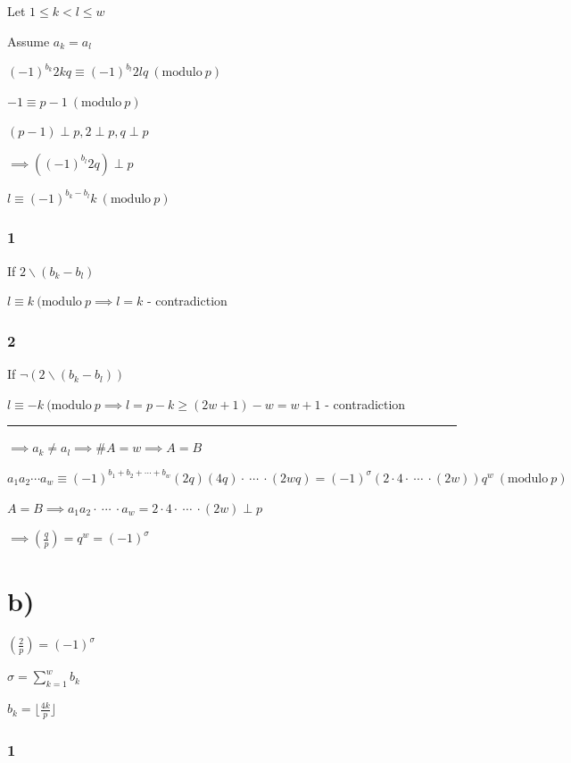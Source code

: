 \documentclass{article}
\begin{document}
Let \( 1 \leq k < l \leq w \)

Assume \( a_k = a_l \)

\( (-1)^{b_k} 2kq \equiv (-1)^{b_l} 2lq \ (\mathrm{modulo}\ p) \)

\( -1 \equiv p - 1  \ (\mathrm{modulo}\ p) \)

\( (p - 1) \perp p, 2 \perp p, q \perp p \)

\( \implies ((-1)^{b_l} 2q) \perp p \)

\( l \equiv (-1)^{b_k-b_l}k \ (\mathrm{modulo}\ p) \)

\subsubsection*{1}

If \( 2 \backslash (b_k - b_l) \)

\( l \equiv k \ (\mathrm{modulo}\ p \implies l = k \) - contradiction

\subsubsection*{2}

If \( \lnot(2 \backslash (b_k - b_l)) \)

\( l \equiv -k \ (\mathrm{modulo}\ p \implies l = p - k \geq (2w+1)-w = w + 1 \) - contradiction

\bigskip\hrule\bigskip

\( \implies a_k \neq a_l \implies \#A = w \implies A = B \)

\( a_1a_2\cdots a_w \equiv (-1)^{b_1+b_2+\cdots + b_w} (2q)(4q) \cdot\ \cdots\ \cdot (2wq) = (-1)^{\sigma} (2 \cdot 4 \cdot\ \cdots\ \cdot (2w))q^w \ (\mathrm{modulo}\ p) \)

\( A = B \implies a_1a_2 \cdot\ \cdots\ \cdot a_w = 2 \cdot 4 \cdot\ \cdots\ \cdot (2w) \perp p \)

\( \implies (\frac{q}{p}) = q^w = (-1)^\sigma \)

\section*{b)}

\( (\frac{2}{p}) = (-1)^\sigma \)

\( \sigma = \sum_{k=1}^w b_k \)

\( b_k = \lfloor{\frac{4k}{p}}\rfloor \)

\subsubsection*{1}
\end{document}
